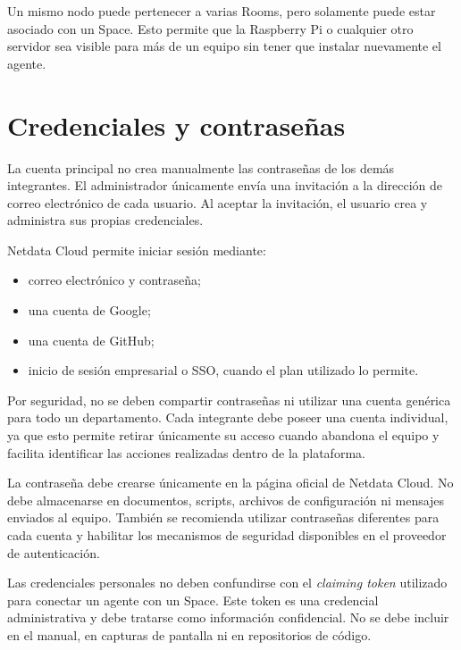 Un mismo nodo puede pertenecer a varias Rooms, pero solamente puede estar asociado con
un Space. Esto permite que la Raspberry Pi o cualquier otro servidor sea visible para
más de un equipo sin tener que instalar nuevamente el agente.



\section{Credenciales y contraseñas}

La cuenta principal no crea manualmente las contraseñas de los demás integrantes. El
administrador únicamente envía una invitación a la dirección de correo electrónico de
cada usuario. Al aceptar la invitación, el usuario crea y administra sus propias
credenciales.

Netdata Cloud permite iniciar sesión mediante:

\begin{itemize}
    \item correo electrónico y contraseña;
    \item una cuenta de Google;
    \item una cuenta de GitHub;
    \item inicio de sesión empresarial o SSO, cuando el plan utilizado lo permite.
\end{itemize}

Por seguridad, no se deben compartir contraseñas ni utilizar una cuenta genérica para
todo un departamento. Cada integrante debe poseer una cuenta individual, ya que esto
permite retirar únicamente su acceso cuando abandona el equipo y facilita identificar
las acciones realizadas dentro de la plataforma.

La contraseña debe crearse únicamente en la página oficial de Netdata Cloud. No debe
almacenarse en documentos, scripts, archivos de configuración ni mensajes enviados al
equipo. También se recomienda utilizar contraseñas diferentes para cada cuenta y
habilitar los mecanismos de seguridad disponibles en el proveedor de autenticación.

Las credenciales personales no deben confundirse con el \textit{claiming token} utilizado
para conectar un agente con un Space. Este token es una credencial administrativa y
debe tratarse como información confidencial. No se debe incluir en el manual, en
capturas de pantalla ni en repositorios de código.




